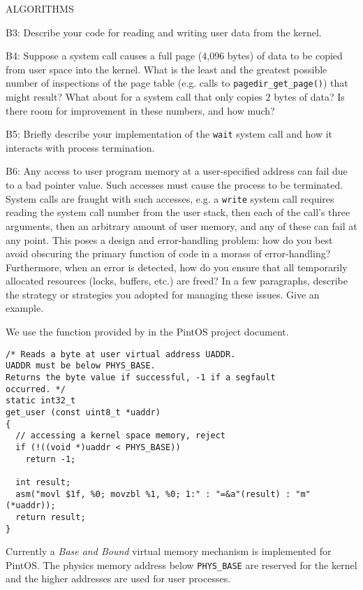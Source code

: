 \begin{aspect}{ALGORITHMS}
	\begin{qc}
		B3: Describe your code for reading and writing user data from the kernel.
	\end{qc}

	\begin{qc}
		B4: Suppose a system call causes a full page (4,096 bytes) of data to be copied from user space into the kernel.
		What is the least and the greatest possible number of inspections of the page table (e.g. calls to \lstinline{pagedir_get_page()}) that might result?
		What about for a system call that only copies 2 bytes of data?
		Is there room for improvement in these numbers, and how much?
	\end{qc}

	\begin{qc}
		B5: Briefly describe your implementation of the \lstinline{wait} system call
		and how it interacts with process termination.
	\end{qc}

	\begin{qc}
		B6: Any access to user program memory at a user-specified address can fail due to a bad pointer value.
		Such accesses must cause the process to be terminated.
		System calls are fraught with such accesses,
		e.g. a \lstinline{write} system call requires reading the system call number from the user stack,
		then each of the call's three arguments, then an arbitrary amount of user memory, and any of these can fail at any point.
		This poses a design and error-handling problem: how do you best avoid obscuring the primary function of code in a morass of error-handling?
		Furthermore, when an error is detected, how do you ensure that all temporarily allocated resources (locks, buffers, etc.) are freed?
		In a few paragraphs, describe the strategy or strategies you adopted for managing these issues.
		Give an example.
	\end{qc}
	We use the function provided by in the PintOS project document.
	\begin{lstlisting}
/* Reads a byte at user virtual address UADDR.
UADDR must be below PHYS_BASE.
Returns the byte value if successful, -1 if a segfault
occurred. */
static int32_t
get_user (const uint8_t *uaddr)
{
  // accessing a kernel space memory, reject
  if (!((void *)uaddr < PHYS_BASE))
    return -1;

  int result;
  asm("movl $1f, %0; movzbl %1, %0; 1:" : "=&a"(result) : "m"(*uaddr));
  return result;
}
	\end{lstlisting}
Currently a \emph{Base and Bound} virtual memory mechanism is implemented for PintOS.
The physics memory address below \lstinline{PHYS_BASE} are reserved for the kernel and the higher addresses are used for user processes.


\end{aspect}
